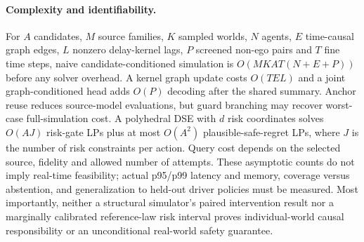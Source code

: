 \documentclass[10pt]{article}
\begin{document}
\paragraph{Complexity and identifiability.}
For $A$ candidates, $M$ source families, $K$ sampled worlds, $N$ agents, $E$ time-causal graph edges, $L$ nonzero delay-kernel lags, $P$ screened non-ego pairs and $T$ fine time steps, naive candidate-conditioned simulation is $O(MKAT(N+E+P))$ before any solver overhead. A kernel graph update costs $O(TEL)$ and a joint graph-conditioned head adds $O(P)$ decoding after the shared summary. Anchor reuse reduces source-model evaluations, but guard branching may recover worst-case full-simulation cost. A polyhedral DSE with $d$ risk coordinates solves $O(AJ)$ risk-gate LPs plus at most $O(A^2)$ plausible-safe-regret LPs, where $J$ is the number of risk constraints per action. Query cost depends on the selected source, fidelity and allowed number of attempts. These asymptotic counts do not imply real-time feasibility; actual p95/p99 latency and memory, coverage versus abstention, and generalization to held-out driver policies must be measured. Most importantly, neither a structural simulator's paired intervention result nor a marginally calibrated reference-law risk interval proves individual-world causal responsibility or an unconditional real-world safety guarantee.

\printbibliography
\end{document}

